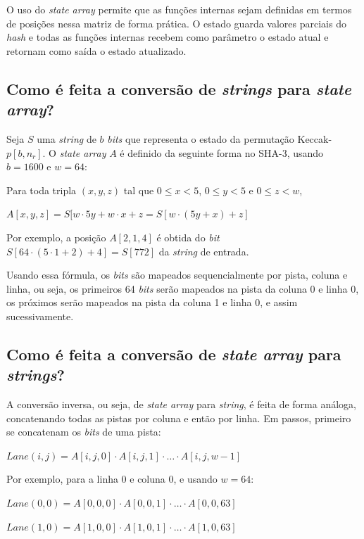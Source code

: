 O uso do \textit{state array} permite que as funções internas sejam definidas
em termos de posições nessa matriz de forma prática. O estado guarda valores
parciais do \textit{hash} e todas as funções internas recebem como parâmetro
o estado atual e retornam como saída o estado atualizado.

\subsection{Como é feita a conversão de \textit{strings} para
    \textit{state array}?}

Seja $S$ uma \textit{string} de $b$ \textit{bits} que representa o estado da
permutação Keccak-$p[b, n_{r}]$. O \textit{state array} $A$ é definido da
seguinte forma no SHA-3, usando $b = 1600$ e $w = 64$:

Para toda tripla $(x, y, z)$ tal que $0 \leq x < 5$, $0 \leq y < 5$ e
$0 \leq z < w$,

\begin{center}
    $A[x, y, z] = S[w \cdot 5y + w \cdot x + z = S[w \cdot (5y+x) + z]$
\end{center}

Por exemplo, a posição $A[2, 1, 4]$ é obtida do \textit{bit}
$S[64 \cdot (5 \cdot 1 + 2) + 4] = S[772]$ da \textit{string} de entrada.

Usando essa fórmula, os \textit{bits} são mapeados sequencialmente por pista,
coluna e linha, ou seja, os primeiros 64 \textit{bits} serão mapeados na pista
da coluna 0 e linha 0, os próximos serão mapeados na pista da coluna 1 e linha
0, e assim sucessivamente.

\subsection{Como é feita a conversão de \textit{state array} para
    \textit{strings}?}

A conversão inversa, ou seja, de \textit{state array} para \textit{string}, é
feita de forma análoga, concatenando todas as pistas por coluna e então por
linha. Em passos, primeiro se concatenam os \textit{bits} de uma pista:

$Lane(i, j) = A[i, j, 0] \cdot A[i, j, 1] \cdot \ldots \cdot A[i, j, w-1]$

Por exemplo, para a linha 0 e coluna 0, e usando $w = 64$:

$Lane(0, 0) = A[0, 0, 0] \cdot A[0, 0, 1] \cdot \ldots \cdot A[0, 0, 63]$

$Lane(1, 0) = A[1, 0, 0] \cdot A[1, 0, 1] \cdot \ldots \cdot A[1, 0, 63]$

